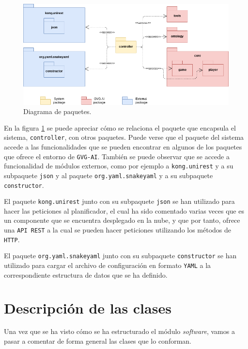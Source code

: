\begin{figure}[H]
    \centering
    \includegraphics[scale=0.48]{img/CH07/package_diagram.png}
    \caption{Diagrama de paquetes.}
    \label{fig:package_diagram}
\end{figure}

En la figura \ref{fig:package_diagram} se puede apreciar cómo se relaciona el paquete
que encapsula el sistema, \texttt{controller}, con otros paquetes. Puede verse que el paquete del sistema
accede a las funcionalidades que se pueden encontrar en algunos de los paquetes que ofrece el entorno de
\texttt{GVG-AI}. También se puede observar que se accede a funcionalidad de módulos externos, como por
ejemplo a \texttt{kong.unirest} y a su subpaquete \texttt{json} y al paquete \texttt{org.yaml.snakeyaml}
y a su subpaquete \texttt{constructor}.

El paquete \texttt{kong.unirest} junto con su subpaquete \texttt{json} se han utilizado
para hacer las peticiones al planificador, el cual ha sido comentado varias veces que es un componente
que se encuentra desplegado en la nube, y que por tanto, ofrece una \texttt{API REST} a la cual se
pueden hacer peticiones utilizando los métodos de \texttt{HTTP}.

El paquete \texttt{org.yaml.snakeyaml} junto con su subpaquete \texttt{constructor} se han
utilizado para cargar el archivo de configuración en formato \texttt{YAML} a la correspondiente
estructura de datos que se ha definido.

\section{Descripción de las clases}

Una vez que se ha visto cómo se ha estructurado el módulo \textit{software}, vamos
a pasar a comentar de forma general las clases que lo conforman.

